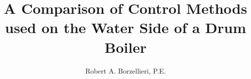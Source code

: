 \documentclass[12pt]{tuthesis}
\begin{document}
    \title{A Comparison of Control Methods used on the Water Side of a Drum Boiler}
    \author{Robert A. Borzellieri, P.E.}
    \campus{}
    \maketitle
    \begin{frontmatter}
        \copyrightpage
        
        
        
        \tableofcontents
        \listoffigures
        \listoftables
    \end{frontmatter}
    
    
    
    
    
    
    
    
    
    
\end{document}
